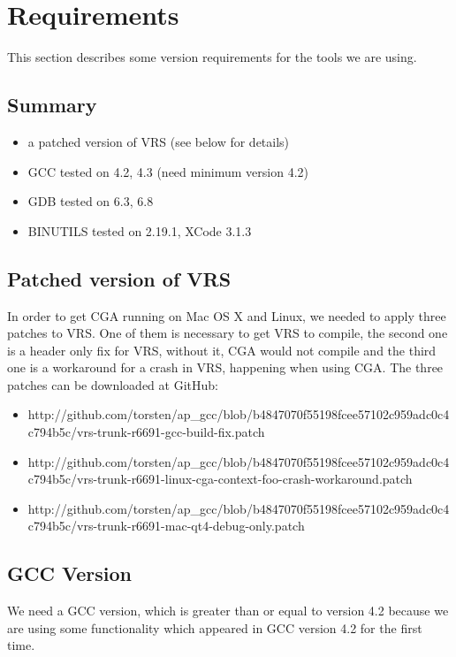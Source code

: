 \section{Requirements} This section describes some version requirements for the tools we are using. 

\subsection{Summary}
\begin{itemize}
    \item a patched version of VRS (see below for details)
	\item GCC tested on 4.2, 4.3 (need minimum version 4.2)
	\item GDB tested on 6.3, 6.8
	\item BINUTILS tested on 2.19.1, XCode 3.1.3
\end{itemize}

\subsection{Patched version of VRS} In order to get CGA running on Mac OS X and Linux, we needed to apply three patches to VRS. One of them is necessary to get VRS to compile, the second one is a header only fix for VRS, without it, CGA would not compile and the third one is a workaround for a crash in VRS, happening when using CGA. The three patches can be downloaded at GitHub:

\begin{itemize}
\item http://github.com/torsten/ap\_gcc/blob/b4847070f55198fcee57102c959adc0c4c794b5c/vrs-trunk-r6691-gcc-build-fix.patch
\item http://github.com/torsten/ap\_gcc/blob/b4847070f55198fcee57102c959adc0c4c794b5c/vrs-trunk-r6691-linux-cga-context-foo-crash-workaround.patch
\item http://github.com/torsten/ap\_gcc/blob/b4847070f55198fcee57102c959adc0c4c794b5c/vrs-trunk-r6691-mac-qt4-debug-only.patch
\end{itemize}

\subsection{GCC Version} We need a GCC version, which is greater than or equal to version 4.2 because we are using some functionality which appeared in GCC version 4.2 for the first time.

